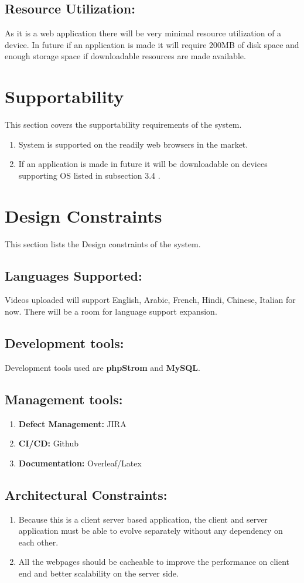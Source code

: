 \documentclass{article}
\begin{document}
\subsection{Resource Utilization:} As it is a web application there will be very minimal resource utilization of a device. In future if an application is made it will require 200MB of disk space and enough storage space if downloadable resources are made available.

\section{ Supportability}
This section covers the supportability requirements of the system.
\begin{enumerate}
    \item System is supported on the readily web browsers in the market.
    \item If an application is made in future it will be downloadable on devices supporting OS listed in subsection 3.4 .
\end{enumerate}

\section{ Design Constraints}
This section lists the Design constraints of the system.
\subsection{Languages Supported:}
Videos uploaded will support English, Arabic, French, Hindi, Chinese, Italian for now. There will be a room for language support expansion.
\subsection{Development tools:}
Development tools used are \textbf{phpStrom} and \textbf{MySQL}.
\subsection{Management tools:}
\begin{enumerate}
    \item \textbf{Defect Management:} JIRA
    \item \textbf{CI/CD:} Github
    \item \textbf{Documentation:} Overleaf/Latex
\end{enumerate}
\subsection{Architectural Constraints:}
\begin{enumerate}
    \item Because this is a client server based application, the client and server application must be able to evolve separately without any dependency on each other.
    \item All the webpages should be cacheable to improve the performance on client end and better scalability on the server side.
\end{enumerate}
\end{document}
